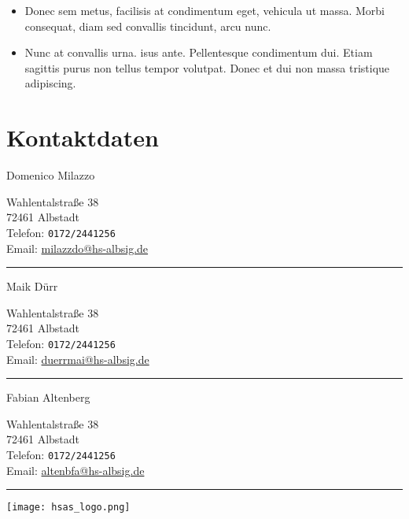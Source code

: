 \documentclass[a0,portrait]{a0poster}
\begin{document}
\begin{multicols}{2}
\begin{itemize}
\item {\LARGE Donec sem metus, facilisis at condimentum eget, vehicula ut massa. Morbi consequat, diam sed convallis tincidunt, arcu nunc.}

\item {\LARGE Nunc at convallis urna. isus ante. Pellentesque condimentum dui. Etiam sagittis purus non tellus tempor volutpat. Donec et dui non massa tristique adipiscing.}
\end{itemize}

\vspace{2cm} %


\color{Black}
\section*{\huge Kontaktdaten}


\vspace{1cm} %

{\huge Domenico Milazzo}\\[1cm] %
{\LARGE 
Wahlentalstraße 38\\
72461 Albstadt\\
Telefon: \texttt{0172/2441256}\\ %
Email: \href{mailto:milazzdo@hs-albsig.de}{milazzdo@hs-albsig.de} %

}
\hrule
\vspace{2cm} %

{\huge\flushleft Maik Dürr}\\[1cm] %
{\LARGE 
Wahlentalstraße 38\\
72461 Albstadt\\
Telefon: \texttt{0172/2441256}\\ %
Email: \href{mailto:duerrmai@hs-albsig.de}{duerrmai@hs-albsig.de} %

}
\hrule
\vspace{2cm}

{\huge\flushleft Fabian Altenberg}\\[1cm] %
{\LARGE 
Wahlentalstraße 38\\
72461 Albstadt\\
Telefon: \texttt{0172/2441256}\\ %
Email: \href{mailto:altenbfa@hs-albsig.de}{altenbfa@hs-albsig.de} %

}
\hrule
\vspace{2cm}


\texttt{[image: hsas\_logo.png]}
\end{multicols}
\end{document}
